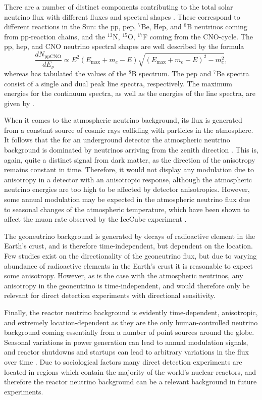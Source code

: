 \documentclass[b5paper, 10pt, twoside]{book}
\newcommand{\der}[2]{\frac{d#1}{d#2}}
\begin{document}
There are a number of distinct components contributing to the total solar neutrino flux with different fluxes and spectral shapes \parencite{VitaglianoTamborraRaffelt2020}. These correspond to different reactions in the Sun: the pp, pep, $^7$Be, Hep, and $^8$B neutrinos coming from pp-reaction chains, and the $^{13}$N, $^{15}$O, $^{17}$F coming from the CNO-cycle. The pp, hep, and CNO neutrino spectral shapes are well described by the formula
\begin{equation}
    \der{N_\text{ppCNO}}{E_\nu}\propto E^2(E_\text{max}+m_e-E)\sqrt{(E_\text{max}+m_e-E)^2-m_e^2},
\end{equation}
whereas \textcite{BahcallEtAl1996} has tabulated the values of the $^8$B spectrum. The pep and $^7$Be spectra consist of a single and dual peak line spectra, respectively. The maximum energies for the continuum spectra, as well as the energies of the line spectra, are given by \textcite{Bahcall1997}.

When it comes to the atmospheric neutrino background, its flux is generated from a constant source of cosmic rays colliding with particles in the atmosphere. It follows that the for an underground detector the atmospheric neutrino background is dominated by neutrinos arriving from the zenith direction \parencite{GaisserHonda2002}. This is, again, quite a distinct signal from dark matter, as the direction of the anisotropy remains constant in time. Therefore, it would not display any modulation due to anisotropy in a detector with an anisotropic response, although the atmospheric neutrino energies are too high to be affected by detector anisotropies. However, some annual modulation may be expected in the atmospheric neutrino flux due to seasonal changes of the atmospheric temperature, which have been shown to affect the muon rate observed by the IceCube experiment \parencite{SerapEtAl2010}.

The geoneutrino background is generated by decays of radioactive element in the Earth's crust, and is therefore time-independent, but dependent on the location. Few studies exist on the directionality of the geoneutrino flux, but due to varying abundance of radioactive elements in the Earth's crust it is reasonable to expect some anisotropy. However, as is the case with the atmospheric neutrinos, any anisotropy in the geoneutrino is time-independent, and would therefore only be relevant for direct detection experiments with directional sensitivity.

Finally, the reactor neutrino background is evidently time-dependent, anisotropic, and extremely location-dependent as they are the only human-controlled neutrino background coming essentially from a number of point sources around the globe. Seasonal variations in power generation can lead to annual modulation signals, and reactor shutdowns and startups can lead to arbitrary variations in the flux over time \parencite{Baldoncini2015}. Due to sociological factors many direct detection experiments are located in regions which contain the majority of the world's nuclear reactors, and therefore the reactor neutrino background can be a relevant background in future experiments.
\end{document}
